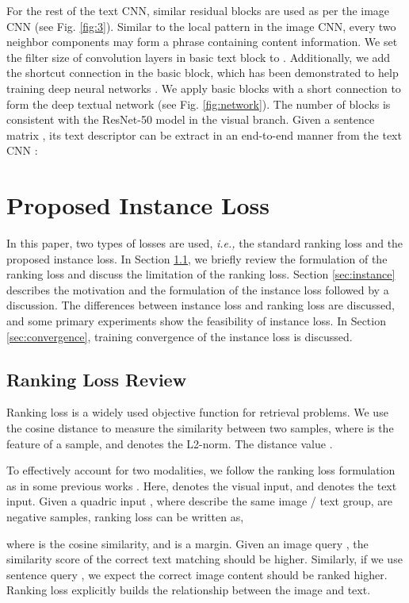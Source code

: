 \documentclass[10pt,final,journal]{IEEEtran}
\begin{document}
For the rest of the text CNN, similar residual blocks are used as per the image CNN (see Fig. \ref{fig:3}). Similar to the local pattern in the image CNN, every two neighbor components may form a phrase containing content information. We set the filter size of convolution layers in basic text block to . Additionally, we add the shortcut connection in the basic block, which has been demonstrated to help training deep neural networks  \cite{he2016deep}. We apply basic blocks with a short connection to form the deep textual network (see Fig. \ref{fig:network}). The number of blocks is consistent with the ResNet-50 model in the visual branch. Given a sentence matrix , its text descriptor  can be extract in an end-to-end manner from the text CNN :


\section{Proposed Instance Loss} \label{sec:loss}
In this paper, two types of losses are used, \emph{i.e.,} the standard ranking loss and the proposed instance loss. In Section \ref{sec:ranking_loss}, we briefly review the formulation of the ranking loss and discuss the limitation of the ranking loss. Section \ref{sec:instance} describes the motivation and the formulation of the instance loss followed by a discussion. The differences between instance loss and ranking loss are discussed, and some primary experiments show the feasibility of instance loss. In Section \ref{sec:convergence}, training convergence of the instance loss is discussed.

\subsection{Ranking Loss Review} \label{sec:ranking_loss}
Ranking loss is a widely used objective function for retrieval problems. We use the cosine distance  to measure the similarity between two samples, where  is the feature of a sample, and  denotes the L2-norm. The distance value .


To effectively account for two modalities, we follow the ranking loss formulation as in some previous works \cite{karpathy2014deep,nam2016dual}. Here,  denotes the visual input, and  denotes the text input. 
Given a quadric input , where  describe the same image / text group,  are negative samples, ranking loss can be written as, 

where  is the cosine similarity, and  is a margin.
Given an image query , the similarity score of the correct text matching should be higher. Similarly, if we use sentence query , we expect the correct image content should be ranked higher. Ranking loss explicitly builds the relationship between the image and text. 
\end{document}
